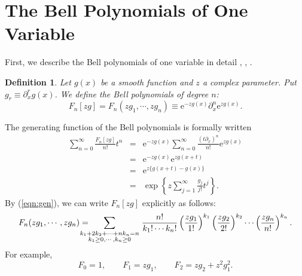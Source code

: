 \documentclass[makeidx,12pt,openany]{report}
\newtheorem{df}{Definition}[chapter]
\begin{document}
\section{The Bell Polynomials of One Variable}
First, we describe the Bell polynomials of one 
variable in detail \cite{Ri}, \cite{Ri1}, \cite{Ri2}.
\begin{df}
Let $g(x)$ be a smooth function and $z$ a complex parameter.
Put $g_r \equiv \partial_x^r g(x)$. 
We define the Bell polynomials of degree $n$: 
 
\begin{equation}
 F_n[zg] = F_n(zg_1, \cdots ,zg_n) 
         \equiv   \mbox{e}^{-zg(x)} \partial_x^n \mbox{e}^{zg(x)}.
\end{equation}
\end{df}
\noindent
The generating function of 
the Bell polynomials is formally written 
\begin{eqnarray}
 \sum_{n=0}^{\infty}\frac{F_n[zg]}{n!}t^n
 &=& \mbox{e}^{-zg(x)}
       \sum_{n=0}^{\infty}\frac{(t\partial_x)^n}{n!} \mbox{e}^{zg(x)} 
        \nonumber\\
 &=& \mbox{e}^{-zg(x)}\mbox{e}^{zg(x+t)} \nonumber\\
 &=& \mbox{e}^{z\{ g(x+t)-g(x) \} } \\
 &=& \exp \left\{ z\sum_{j=1}^{\infty}\frac{g_j}{j!}t^j \right\} .
      \label{eqn:gen}
\end{eqnarray}
By (\ref{eqn:gen}), we can write $F_n[zg]$ explicitly as follows:
\begin{equation}
F_n(zg_1, \cdots ,zg_n) = \hspace{-5mm}
    \sum_{{\scriptstyle k_1+2k_2+ \cdots +nk_n=n}\atop
          {\scriptstyle k_1 \geq 0,\cdots ,k_n \geq 0}}
         \frac{n!}{k_1! \cdots k_n!} 
         \left(
          \frac{zg_1}{1!}
         \right)^{k_1}
         \left(
          \frac{zg_2}{2!}
         \right)^{k_2}
            \cdots
         \left(
          \frac{zg_n}{n!}
         \right)^{k_n}.
\end{equation}
For example, 
$$
F_0=1, \qquad F_1=zg_1, \qquad F_2=zg_2 + z^2 g_1^2.
$$
\end{document}
